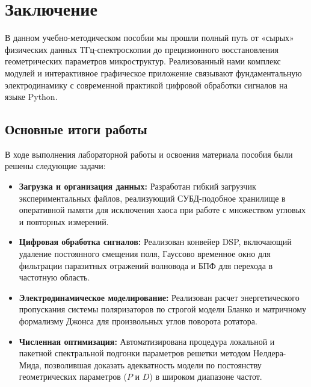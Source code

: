 
\section*{Заключение}

В данном учебно-методическом пособии мы прошли полный путь от «сырых» физических данных ТГц-спектроскопии до прецизионного восстановления геометрических параметров микроструктур. Реализованный нами комплекс модулей и интерактивное графическое приложение связывают фундаментальную электродинамику с современной практикой цифровой обработки сигналов на языке Python.

\subsection*{Основные итоги работы}
В ходе выполнения лабораторной работы и освоения материала пособия были решены следующие задачи:
\begin{itemize}
    \item \textbf{Загрузка и организация данных:} Разработан гибкий загрузчик экспериментальных файлов, реализующий СУБД-подобное хранилище в оперативной памяти для исключения хаоса при работе с множеством угловых и повторных измерений.
    \item \textbf{Цифровая обработка сигналов:} Реализован конвейер DSP, включающий удаление постоянного смещения поля, Гауссово временное окно для фильтрации паразитных отражений волновода и БПФ для перехода в частотную область.
    \item \textbf{Электродинамическое моделирование:} Реализован расчет энергетического пропускания системы поляризаторов по строгой модели Бланко и матричному формализму Джонса для произвольных углов поворота ротатора.
    \item \textbf{Численная оптимизация:} Автоматизирована процедура локальной и пакетной спектральной подгонки параметров решетки методом Нелдера-Мида, позволившая доказать адекватность модели по постоянству геометрических параметров ($P$ и $D$) в широком диапазоне частот.
\end{itemize}

